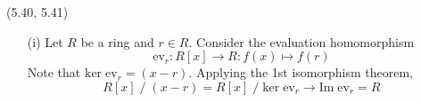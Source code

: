 \vspace{2ex}
\begin{ex}
(5.40, 5.41) 
\begin{itemize}
\item[(i)] Let $R$ be a ring and $r\in R$. Consider the evaluation homomorphism 
\[\mathrm{ev}_{r}:R[x]\rightarrow R:f(x)\mapsto f(r)\]
Note that $\mathrm{ker}\;\mathrm{ev}_{r}=(x-r)$. Applying the 1st isomorphism theorem,
\[R[x]\;/\;(x-r)=R[x]\;/\;\mathrm{ker}\;\mathrm{ev}_{r}\rightarrow \mathrm{Im}\;\mathrm{ev}_{r}=R \]
\end{itemize}
\end{ex}
\vspace{2ex}

